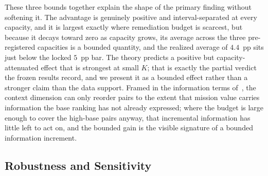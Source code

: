 These three bounds together explain the shape of the primary finding without
softening it. The advantage is genuinely positive and interval-separated at every
capacity, and it is largest exactly where remediation budget is scarcest, but
because it decays toward zero as capacity grows, its average across the three
pre-registered capacities is a bounded quantity, and the realized average of
$4.4$~pp sits just below the locked $5$~pp bar. The theory predicts a positive but
capacity-attenuated effect that is strongest at small $K$; that is exactly the
partial verdict the frozen results record, and we present it as a bounded effect
rather than a stronger claim than the data support. Framed in the information
terms of~\cite{cover2006elements}, the context dimension can only reorder pairs to
the extent that mission value carries information the base ranking has not already
expressed; where the budget is large enough to cover the high-base pairs anyway,
that incremental information has little left to act on, and the bounded gain is the
visible signature of a bounded information increment.

\subsection{Robustness and Sensitivity}
\label{sec:theory_robustness}

